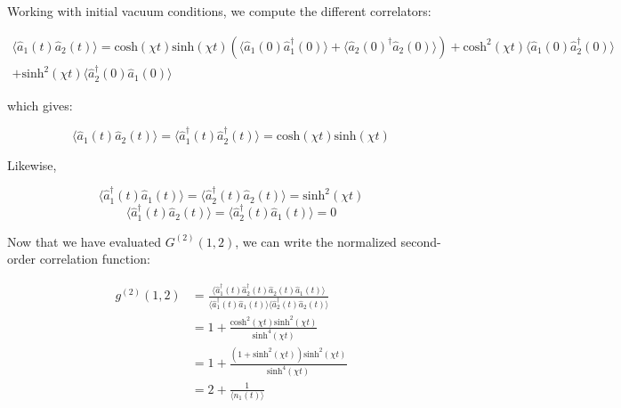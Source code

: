 \noindent Working with initial vacuum conditions, we compute the different correlators:

\begin{equation}
\begin{split}
   \langle \hat{a}_1(t) \hat{a}_2(t) \rangle = \mathrm{cosh} (\chi t) \mathrm{sinh} (\chi t) (\langle \hat{a}_1(0) \hat{a}_1^{\dagger}(0) \rangle+ \langle \hat{a}_2(0)^{\dagger} \hat{a}_2(0) \rangle) + \mathrm{cosh}^2 (\chi t) \langle \hat{a}_1(0) \hat{a}_2^{\dagger}(0) \rangle \\
   + \mathrm{sinh}^2 (\chi t) \langle \hat{a}_2^{\dagger}(0) \hat{a}_1(0) \rangle 
\end{split}
\end{equation}

\noindent which gives:

\begin{equation}
    \langle \hat{a}_1(t) \hat{a}_2(t) \rangle = \langle \hat{a}_1^{\dagger}(t) \hat{a}_2^{\dagger}(t) \rangle = \mathrm{cosh} (\chi t) \mathrm{sinh} (\chi t)
\end{equation}

\noindent Likewise,

\begin{equation}
     \langle \hat{a}_1^{\dagger}(t) \hat{a}_1(t) \rangle = \langle \hat{a}_2^{\dagger}(t) \hat{a}_2(t) \rangle = \mathrm{sinh}^2 (\chi t)
\end{equation}
\begin{equation}
    \langle \hat{a}_1^{\dagger}(t) \hat{a}_2(t) \rangle =  \langle \hat{a}_2^{\dagger}(t) \hat{a}_1(t) \rangle = 0
\end{equation}

\noindent Now that we have evaluated $G^{(2)}(1,2)$, we can write the normalized second-order correlation function:

\begin{equation}
\begin{aligned}
      g^{(2)}(1,2) & = \frac{\langle \hat{a}_1^{\dagger}(t) \hat{a}_2^{\dagger}(t) \hat{a}_2(t) \hat{a}_1(t) \rangle}{\langle \hat{a}_1^{\dagger}(t) \hat{a}_1(t) \rangle \langle \hat{a}_2^{\dagger}(t) \hat{a}_2(t) \rangle} \\
      & = 1 + \frac{\mathrm{cosh}^2 (\chi t) \mathrm{sinh}^2 (\chi t)}{\mathrm{sinh}^4 (\chi t)} \\
      & = 1+\frac{(1+\mathrm{sinh}^2 (\chi t))\mathrm{sinh}^2 (\chi t)}{\mathrm{sinh}^4 (\chi t)} \\
      & = 2 + \frac{1}{\langle n_1(t) \rangle} 
      \label{eq:amp_g2_A}
\end{aligned}
\end{equation}

